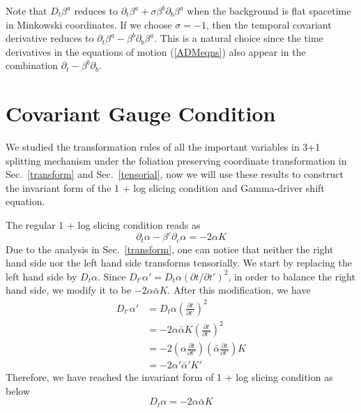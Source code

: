 \documentclass[letterpaper,nofootinbib,prd,amsmath,onecolumn]{revtex4-1}
\begin{document}
Note that $D_t\beta^a$ reduces to $\partial_t\beta^a + \sigma\beta^b\partial_b\beta^a$ when the background is flat spacetime in Minkowski coordinates. 
If we choose $\sigma = -1$, then the temporal covariant derivative reduces to 
$\partial_t\beta^a - \beta^b\partial_b\beta^a$. This is a natural choice since the time derivatives in the equations of motion (\ref{ADMeqns}) also 
appear in the combination $\partial_t - \beta^b \partial_b$. 
\section{Covariant Gauge Condition}\label{gauge}
We studied the transformation rules of all the important variables in 3+1 splitting mechanism under the foliation preserving coordinate transformation in Sec.~\ref{transform} and Sec.~\ref{tensorial}, now we will use these results to construct the invariant form of the 1 + log slicing condition and Gamma-driver shift equation. 

The regular 1 + log slicing condition reads as
\begin{equation}\label{1 + log slicing}
\partial_{t}\alpha - \beta^{c}\partial_{c}\alpha = -2\alpha K
\end{equation}
Due to the analysis in Sec.~\ref{transform}, one can notice that neither the right hand side nor the left hand side transforms tensorially. We start by replacing the left hand side by $D_{t}\alpha$. Since $D_{t'}\alpha' = D_{t}\alpha(\partial t/\partial t')^{2}$, in order to balance the right hand side, we modify it to be $-2\alpha {\bar \alpha}K$. After this modification, we have
\begin{align*}
D_{t'}\alpha' & = D_{t}\alpha\left(\frac{\partial t}{\partial t'}\right)^{2}\\
& = -2\alpha{\bar \alpha}K\left(\frac{\partial t}{\partial t'}\right)^{2}\\
& = -2\left(\alpha\frac{\partial t}{\partial t'}\right)\left({\bar \alpha}\frac{\partial t}{\partial t'}\right)K\\
& = -2\alpha'{\bar \alpha}'K'
\end{align*}
Therefore, we have reached the invariant form of 1 + log slicing condition as below
\begin{equation}\label{invariant 1 + log slicing}
D_{t}\alpha = -2\alpha{\bar \alpha}K
\end{equation}
\end{document}

